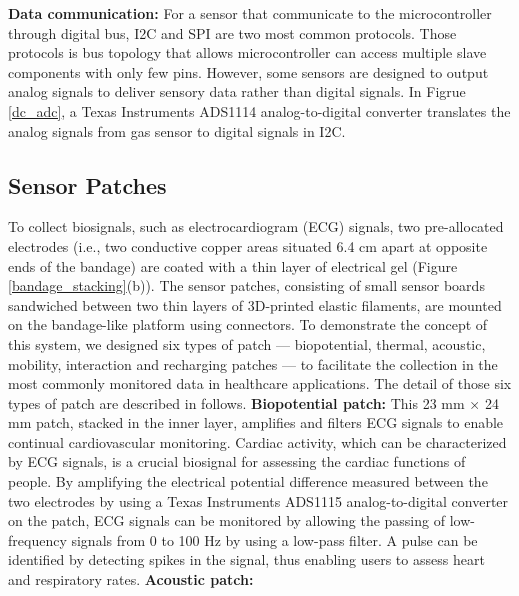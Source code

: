 \vspace{10pt}
\textbf{Data communication:}
\newline
For a sensor that communicate to the microcontroller through digital bus, I2C and SPI are two most common protocols. Those protocols is bus topology that allows microcontroller can access multiple slave components with only few pins. However, some sensors are designed to output analog signals to deliver sensory data rather than digital signals. In Figrue \ref{dc_adc}, a Texas Instruments ADS1114 analog-to-digital converter translates the analog signals from gas sensor to digital signals in I2C.

\subsection{Sensor Patches}
To collect biosignals, such as electrocardiogram (ECG) signals, two pre-allocated electrodes (i.e., two conductive copper areas situated 6.4 cm apart at opposite ends of the bandage) are coated with a thin layer of electrical gel (Figure \ref{bandage_stacking}(b)).
The sensor patches, consisting of small sensor boards sandwiched between two thin layers of 3D-printed elastic filaments, are mounted on the bandage-like platform using connectors. To demonstrate the concept of this system, we designed six types of patch — biopotential, thermal, acoustic, mobility, interaction and recharging patches — to facilitate the collection in the most commonly monitored data in healthcare applications.
The detail of those six types of patch are described in follows.
\vspace{15pt}
\newline 
\textbf{Biopotential patch:}
\newline
This 23 mm × 24 mm patch, stacked in the inner layer, amplifies and filters ECG signals to enable continual cardiovascular monitoring. Cardiac activity, which can be characterized by ECG signals, is a crucial biosignal for assessing the cardiac functions of people. By amplifying the electrical potential difference measured between the two electrodes by using a Texas Instruments ADS1115 analog-to-digital converter on the patch, ECG signals can be monitored by allowing the passing of low-frequency signals from 0 to 100 Hz \cite{shaikh1995} by using a low-pass filter. A pulse can be identified by detecting spikes in the signal, thus enabling users to assess heart and respiratory rates.
\vspace{10pt}
\newpage
\textbf{Acoustic patch:}
\newline
